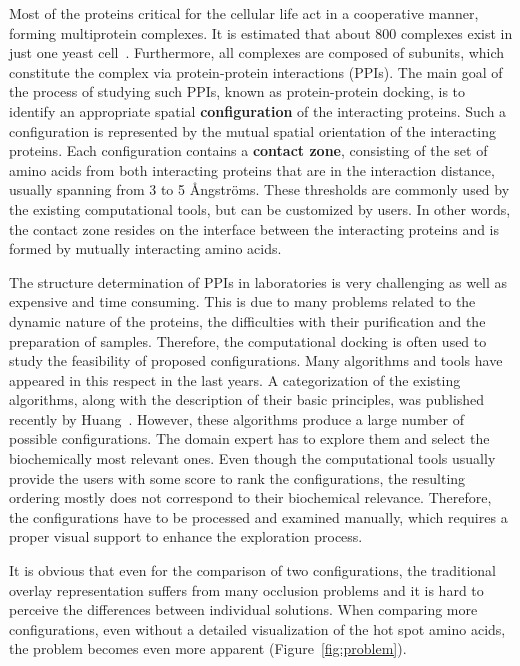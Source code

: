 \documentclass{bmcart}
\begin{document}
Most of the proteins critical for the cellular life act in a cooperative manner, forming multiprotein complexes. 
It is estimated that about 800 complexes exist in just one yeast cell~\cite{Gavin}. 
Furthermore, all complexes are composed of subunits, which constitute the complex via protein-protein interactions (PPIs).
The main goal of the process of studying such PPIs, known as protein-protein docking, is to identify an appropriate spatial \textbf{configuration} of the interacting proteins.
Such a configuration is represented by the mutual spatial orientation of the interacting proteins.
Each configuration contains a \textbf{contact zone}, consisting of the set of amino acids from both interacting proteins that are in the interaction distance, usually spanning from 3 to 5 \AA ngstr\"{o}ms.
These thresholds are commonly used by the existing computational tools, but can be customized by users.
In other words, the contact zone resides on the interface between the interacting proteins and is formed by mutually interacting amino acids.

The structure determination of PPIs in laboratories is very challenging as well as expensive and time consuming.
This is due to many problems related to the dynamic nature of the proteins, the difficulties with their purification and the preparation of samples.
Therefore, the computational docking is often used to study the feasibility of proposed configurations.
Many algorithms and tools have appeared in this respect in the last years.
A categorization of the existing algorithms, along with the description of their basic principles, was published recently by Huang~\cite{Huang2014}.
However, these algorithms produce a large number of possible configurations.
The domain expert has to explore them and select the biochemically most relevant ones. 
Even though the computational tools usually provide the users with some score to rank the configurations, the resulting ordering mostly does not correspond to their biochemical relevance.
Therefore, the configurations have to be processed and examined manually, which requires a proper visual support to enhance the exploration process.

It is obvious that even for the comparison of two configurations, the traditional overlay representation suffers from many occlusion problems and it is hard to perceive the differences between individual solutions.
When comparing more configurations, even without a detailed visualization of the hot spot amino acids, the problem becomes even more apparent (Figure~\ref{fig:problem}).
\end{document}
